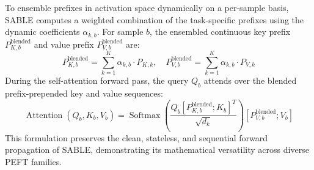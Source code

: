 \documentclass{article}
\theoremstyle{plain}
\theoremstyle{definition}
\theoremstyle{remark}
\begin{document}
To ensemble prefixes in activation space dynamically on a per-sample basis, SABLE computes a weighted combination of the task-specific prefixes using the dynamic coefficients $\alpha_{k, b}$. For sample $b$, the ensembled continuous key prefix $P_{K, b}^{\text{blended}}$ and value prefix $P_{V, b}^{\text{blended}}$ are:
\begin{equation}
P_{K, b}^{\text{blended}} = \sum_{k=1}^K \alpha_{k, b} \cdot P_{K, k}, \quad P_{V, b}^{\text{blended}} = \sum_{k=1}^K \alpha_{k, b} \cdot P_{V, k}
\end{equation}
During the self-attention forward pass, the query $Q_b$ attends over the blended prefix-prepended key and value sequences:
\begin{equation}
\operatorname{Attention}(Q_b, K_b, V_b) = \operatorname{Softmax}\left( \frac{Q_b [P_{K, b}^{\text{blended}}; K_b]^T}{\sqrt{d_k}} \right) [P_{V, b}^{\text{blended}}; V_b]
\end{equation}
This formulation preserves the clean, stateless, and sequential forward propagation of SABLE, demonstrating its mathematical versatility across diverse PEFT families.
\end{document}
